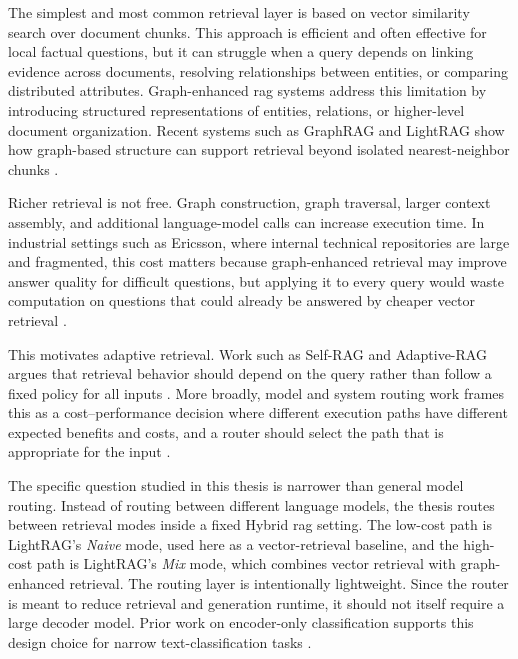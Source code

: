 \documentclass[english, bibtex]{kththesis}               %
\numberwithin{listing}{chapter}
\begin{document}
The simplest and most common retrieval layer is based on vector similarity search over document chunks. This approach is efficient and often effective for local factual questions, but it can struggle when a query depends on linking evidence across documents, resolving relationships between entities, or comparing distributed attributes. Graph-enhanced \gls{rag} systems address this limitation by introducing structured representations of entities, relations, or higher-level document organization. Recent systems such as GraphRAG and LightRAG show how graph-based structure can support retrieval beyond isolated nearest-neighbor chunks \cite{edge2024graphrag,lightrag2024}.

Richer retrieval is not free. Graph construction, graph traversal, larger context assembly, and additional language-model calls can increase execution time. In industrial settings such as Ericsson, where internal technical repositories are large and fragmented, this cost matters because graph-enhanced retrieval may improve answer quality for difficult questions, but applying it to every query would waste computation on questions that could already be answered by cheaper vector retrieval \cite{jeong2024adaptiverag,hu2024routerbench}.

This motivates adaptive retrieval. Work such as Self-RAG and Adaptive-RAG argues that retrieval behavior should depend on the query rather than follow a fixed policy for all inputs \cite{asai2023selfrag,jeong2024adaptiverag}. More broadly, model and system routing work frames this as a cost--performance decision where different execution paths have different expected benefits and costs, and a router should select the path that is appropriate for the input \cite{hu2024routerbench}.

The specific question studied in this thesis is narrower than general model routing. Instead of routing between different language models, the thesis routes between retrieval modes inside a fixed Hybrid \gls{rag} setting. The low-cost path is LightRAG's \emph{Naive} mode, used here as a vector-retrieval baseline, and the high-cost path is LightRAG's \emph{Mix} mode, which combines vector retrieval with graph-enhanced retrieval. The routing layer is intentionally lightweight. Since the router is meant to reduce retrieval and generation runtime, it should not itself require a large decoder model. Prior work on encoder-only classification supports this design choice for narrow text-classification tasks \cite{benayas2024encoder}.
\end{document}
